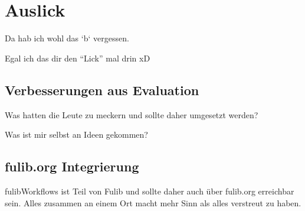 \chapter{Auslick}\label{ch:ausblick}
Da hab ich wohl das `b` vergessen.

Egal ich das dir den ``Lick'' mal drin xD

\section{Verbesserungen aus Evaluation}\label{sec:verbesserungen-aus-evaluation}
Was hatten die Leute zu meckern und sollte daher umgesetzt werden?

Was ist mir selbst an Ideen gekommen?

\section{fulib.org Integrierung}\label{sec:fulib.org-integrierung}
fulibWorkflows ist Teil von Fulib und sollte daher auch über fulib.org erreichbar sein.
Alles zusammen an einem Ort macht mehr Sinn als alles verstreut zu haben.
